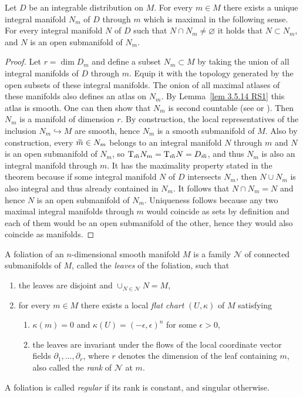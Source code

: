 \begin{thm}[{{\cite[Thm.~3.5.17]{RS1}}}]\label{thm 3.5.17 RS1}
    Let $D$ be an integrable distribution on $M$. For every $m\in M$ there exists a unique integral manifold $N_m$ of $D$ through $m$ which is maximal in the following sense. For every integral manifold $N$ of $D$ such that $N\cap N_m\neq \varnothing$ it holds that $N\subset N_m$, and $N$ is an open submanifold of $N_m$.
\end{thm}
\begin{proof}
    Let $r=\dim D_m$ and define a subset $N_m\subset M$ by taking the union of all integral manifolds of $D$ through $m$. Equip it with the topology generated by the open subsets of these integral manifolds. The onion of all maximal atlases of these manifolds also defines an atlas on $N_m$. By Lemma~\ref{lem 3.5.14 RS1} this atlas is smooth.  One can then show that $N_m$ is second countable (see \cite[Lem.~19.22]{Lee} or \cite[Thm.~1.64]{Warner}). Then $N_m$ is a manifold of dimension $r$. By construction, the local representatives of the inclusion $N_m\hookrightarrow M$ are smooth, hence $N_m$ is a smooth submanifold of $M$. Also by construction, every $\wt{m}\in N_m$ belongs to an integral manifold $N$ through $m$ and $N$ is an open submanifold of $N_m$, so $\T_{\wt m}N_m=\T_{\wt m}N=D_{\wt m}$, and thus $N_m$ is also an integral manifold through $m$. It has the maximality property stated in the theorem because if some integral manifold $N$ of $D$ intersects $N_m$, then $N\cup N_m$ is also integral and thus already contained in $N_m$. It follows that $N\cap N_m=N$ and hence $N$ is an open submanifold of $N_m$. Uniqueness follows because any two maximal integral manifolds through $m$ would coincide as sets by definition and each of them would be an open submanifold of the other, hence they would also coincide as manifolds.
\end{proof}


\begin{defn}[Foliation]
    A foliation of an $n$-dimensional smooth manifold $M$ is a family $\mathcal{N}$ of connected submanifolds of $M$, called the \emph{leaves} of the foliation, such that
    \begin{enumerate}
        \item the leaves are disjoint and $\cup_{N\in\mathcal{N}}N=M$,
        \item for every $m\in M$ there exists a local \emph{flat chart} $(U,\kappa)$ of $M$ satisfying
        \begin{enumerate}[label=(\alph*)]
            \item $\kappa(m)=0$ and $\kappa(U)=(-\epsilon,\epsilon)^n$ for some $\epsilon>0$,
            \item the leaves are invariant under the flows of the local coordinate vector fields $\partial_1,\dots,\partial_r$, where $r$ denotes the dimension of the leaf containing $m$, also called the \emph{rank} of $\mathcal{N}$ at $m$.
        \end{enumerate}
    \end{enumerate}
    A foliation is called \emph{regular} if its rank is constant, and singular otherwise.
\end{defn}



